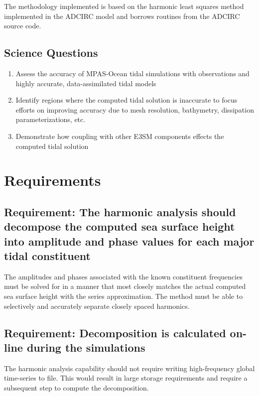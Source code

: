 \documentclass[11pt]{report}
\begin{document}
The methodology implemented is based on the harmonic least squares method \cite{westerink_lsq} implemented in the ADCIRC model \cite{Luettich1992ADCIRC} and borrows routines from the ADCIRC source code.

\section{Science Questions}
\begin{enumerate}
    \item Assess the accuracy of MPAS-Ocean tidal simulations with observations and highly accurate, data-assimilated tidal models
    \item Identify regions where the computed tidal solution is inaccurate to focus efforts on improving accuracy due to mesh resolution, bathymetry, dissipation parameterizations, etc.
    \item Demonstrate how coupling with other E3SM components effects the computed tidal solution
\end{enumerate}


\chapter{Requirements}

\section{Requirement: The harmonic analysis should decompose the computed sea surface height into amplitude and phase values for each major tidal constituent}
The amplitudes and phases associated with the known constituent frequencies must be solved for in a manner that most closely matches the actual computed sea surface height with the series approximation. The method must be able to selectively and accurately separate closely spaced harmonics. 

\section{Requirement: Decomposition is calculated on-line during the simulations}
The harmonic analysis capability should not require writing high-frequency global time-series to file. This would result in large storage requirements and require a subsequent step to compute the decomposition. 
\end{document}
